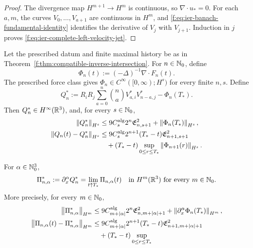 \begin{proof}
The divergence map \(H^{m+1}\to H^m\) is continuous, so
\(\nabla\cdot u_*=0\).  For each \(a,m\), the curves
\(V_0,\ldots,V_{a+1}\) are continuous in \(H^m\), and
\eqref{f:eq:ier-banach-fundamental-identity} identifies the derivative of
\(V_j\) with \(V_{j+1}\).  Induction in \(j\) proves
\eqref{f:eq:ier-complete-left-velocity-jet}.
\end{proof}

\begin{theorem}
\label{f:thm:ier-pressure-complete-endpoint}
\begin{samepage}
Let the prescribed datum and finite maximal history be as in
Theorem~\ref{f:thm:compatible-inverse-intersection}.
For \(n\in\mathbb N_0\), define
\[
 \Phi_n(t):=(-\Delta)^{-1}\nabla\cdot F_n(t).
\]
The prescribed force class gives
\(\Phi_n\in C^\infty([0,\infty);H^s)\) for every finite \(n,s\).  Define
\begin{equation}
 Q_n^*:=R_iR_j\sum_{a=0}^{n}\binom na
 V_{a,i}^*V_{n-a,j}^*-\Phi_n(T_*).
 \label{f:eq:ier-terminal-pressure-row}
\end{equation}
Then \(Q_n^*\in H^\infty(\mathbb R^3)\), and, for every \(s\in\mathbb N_0\),
\begin{align}
 \left\lVert Q_n^*\right\rVert_{H^s}
 &\le9C_s^{\rm alg}2^n\mathfrak E_{n,s+1}^2
 +\left\lVert \Phi_n(T_*)\right\rVert_{H^s},
 \label{f:eq:ier-terminal-pressure-size}\\
 \left\lVert Q_n(t)-Q_n^*\right\rVert_{H^s}
 &\le9C_s^{\rm alg}2^{n+1}(T_*-t)\mathfrak E_{n+1,s+1}^2\\
 &\quad +(T_*-t)
 \sup_{0\le r\le T_*}\left\lVert \Phi_{n+1}(r)\right\rVert_{H^s}.
 \label{f:eq:ier-terminal-pressure-modulus}
\end{align}
\end{samepage}
For \(\alpha\in\mathbb N_0^3\),
\begin{equation}
 \Pi_{n,\alpha}^*:=\partial_x^\alpha Q_n^*
 =\lim_{t\uparrow T_*}\Pi_{n,\alpha}(t)
 \quad\text{in }H^m(\mathbb R^3)\text{ for every }m\in\mathbb N_0.
 \label{f:eq:ier-terminal-mixed-pressure-row}
\end{equation}
More precisely, for every \(m\in\mathbb N_0\),
\begin{align}
 \norm{\Pi_{n,\alpha}^*}_{H^m}
 &\le9C_{m+|\alpha|}^{\rm alg}2^n
 \mathfrak E_{n,m+|\alpha|+1}^2
 +\norm{\partial_x^\alpha\Phi_n(T_*)}_{H^m},
 \label{f:eq:ier-terminal-mixed-pressure-size}\\
 \norm{\Pi_{n,\alpha}(t)-\Pi_{n,\alpha}^*}_{H^m}
 &\le9C_{m+|\alpha|}^{\rm alg}2^{n+1}(T_*-t)
 \mathfrak E_{n+1,m+|\alpha|+1}^2\\
 &\quad +(T_*-t)\sup_{0\le r\le T_*}

\end{align}
\end{theorem}
